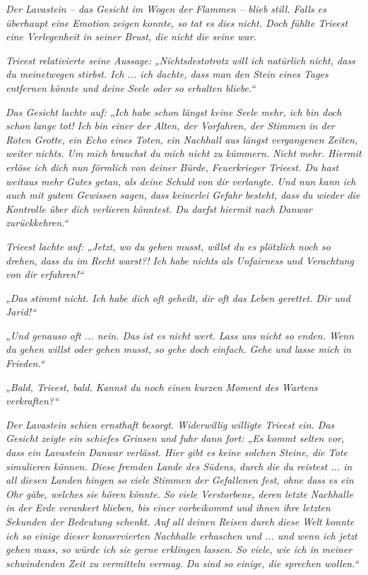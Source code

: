 \textit{Der Lavastein – das Gesicht im Wogen der Flammen – blieb still. Falls es überhaupt eine Emotion zeigen konnte, so tat es dies nicht. Doch fühlte Trieest eine Verlegenheit in seiner Brust, die nicht die seine war.}

\textit{Trieest relativierte seine Aussage: „Nichtsdestotrotz will ich natürlich nicht, dass du meinetwegen stirbst. Ich ... ich dachte, dass man den Stein eines Tages entfernen könnte und deine Seele oder so erhalten bliebe.“}

\textit{Das Gesicht lachte auf: „Ich habe schon längst keine Seele mehr, ich bin doch schon lange tot! Ich bin einer der Alten, der Vorfahren, der Stimmen in der Roten Grotte, ein Echo eines Toten, ein Nachhall aus längst vergangenen Zeiten, weiter nichts. Um mich brauchst du mich nicht zu kümmern. Nicht mehr. Hiermit erlöse ich dich nun förmlich von deiner Bürde, Feuerkrieger Trieest. Du hast weitaus mehr Gutes getan, als deine Schuld von dir verlangte. Und nun kann ich auch mit gutem Gewissen sagen, dass keinerlei Gefahr besteht, dass du wieder die Kontrolle über dich verlieren könntest. Du darfst hiermit nach Danwar zurückkehren.“}

\textit{Trieest lachte auf: „Jetzt, wo du gehen musst, willst du es plötzlich noch so drehen, dass du im Recht warst?! Ich habe nichts als Unfairness und Verachtung von dir erfahren!“}

\textit{„Das stimmt nicht. Ich habe dich oft geheilt, dir oft das Leben gerettet. Dir und Jarid!“}

\textit{„Und genauso oft ... nein. Das ist es nicht wert. Lass uns nicht so enden. Wenn du gehen willst oder gehen musst, so gehe doch einfach. Gehe und lasse mich in Frieden.“}

\textit{„Bald, Trieest, bald. Kannst du noch einen kurzen Moment des Wartens verkraften?“}

\textit{Der Lavastein schien ernsthaft besorgt. Widerwillig willigte Trieest ein. Das Gesicht zeigte ein schiefes Grinsen und fuhr dann fort: „Es kommt selten vor, dass ein Lavastein Danwar verlässt. Hier gibt es keine solchen Steine, die Tote simulieren können. Diese fremden Lande des Südens, durch die du reistest ... in all diesen Landen hingen so viele Stimmen der Gefallenen fest, ohne dass es ein Ohr gäbe, welches sie hören könnte. So viele Verstorbene, deren letzte Nachhalle in der Erde verankert blieben, bis einer vorbeikommt und ihnen ihre letzten Sekunden der Bedeutung schenkt. Auf all deinen Reisen durch diese Welt konnte ich so einige dieser konservierten Nachhalle erhaschen und ... und wenn ich jetzt gehen muss, so würde ich sie gerne erklingen lassen. So viele, wie ich in meiner schwindenden Zeit zu vermitteln vermag. Da sind so einige, die sprechen wollen.“}\bigskip



